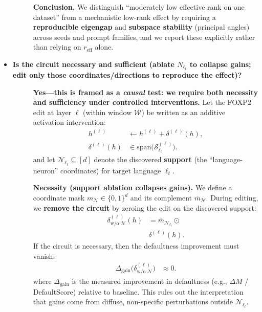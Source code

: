 \begin{itemize}[leftmargin=1.5em]
\begin{description}
\vspace{3pt}
\textbf{Conclusion.} We distinguish “moderately low effective rank on one dataset” from a mechanistic low-rank effect by requiring a \textbf{reproducible eigengap} and \textbf{subspace stability} (principal angles) across seeds and prompt families, and we report these explicitly rather than relying on $r_{\mathrm{eff}}$ alone.
\end{description}








\item[\ding{93}] \textbf{Is the circuit necessary and sufficient (ablate $N_{\ell_t}$ to collapse gains; edit only those coordinates/directions to reproduce the effect)?}
\begin{description}
\item[] \textbf{Yes—this is framed as a \emph{causal} test: we require both \textbf{necessity} and \textbf{sufficiency} under controlled interventions.}
Let the FOXP2 edit at layer $\ell$ (within window $\mathcal{W}$) be written as an additive activation intervention:
\[
\begin{aligned}
h^{(\ell)} &\leftarrow h^{(\ell)} + \delta^{(\ell)}(h),\\
\delta^{(\ell)}(h) &\in \mathrm{span}\!\big(\mathcal{S}^{(\ell)}_{\ell_t}\big).
\end{aligned}
\]
and let $\mathcal{N}_{\ell_t}\subseteq[d]$ denote the discovered \textbf{support} (the “language-neuron” coordinates) for target language $\ell_t$.

\vspace{4pt}
\textbf{Necessity (support ablation collapses gains).}
We define a coordinate mask $m_{\mathcal{N}}\in\{0,1\}^d$ and its complement $\bar m_{\mathcal{N}}$. During editing, we \textbf{remove the circuit} by zeroing the edit on the discovered support:
\[
\begin{aligned}
\delta^{(\ell)}_{\text{w/o }\mathcal{N}}(h) &= \bar m_{\mathcal{N}_{\ell_t}}\odot\\
&\delta^{(\ell)}(h).
\end{aligned}
\]
If the circuit is necessary, then the defaultness improvement must vanish:
\[
\begin{aligned}
\Delta_{\mathrm{gain}}\big(\delta^{(\ell)}_{\text{w/o }\mathcal{N}}\big)
&\approx 0.
\end{aligned}
\]
where $\Delta_{\mathrm{gain}}$ is the measured improvement in defaultness (e.g., $\Delta M$ / DefaultScore) relative to baseline. This rules out the interpretation that gains come from diffuse, non-specific perturbations outside $\mathcal{N}_{\ell_t}$.


\end{description}
\end{itemize}
